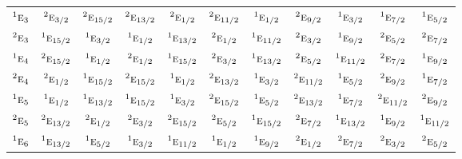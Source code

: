 \documentclass[10pt,a4paper]{article}
\numberwithin{equation}{section}
\newcommand{\irr}[1]{\text{\normalfont\scshape #1}}
\newcommand{\conjpair}[1]{{}^{#1}}
\begin{document}
{\begin{longtable}{@{}lcccccccccc@{}}
$\conjpair{1}\irr{e}_{3}$ & $\conjpair{2}\irr{e}_{3/2}$ & $\conjpair{2}\irr{e}_{15/2}$ & $\conjpair{2}\irr{e}_{13/2}$ & $\conjpair{2}\irr{e}_{1/2}$ & $\conjpair{2}\irr{e}_{11/2}$ & $\conjpair{1}\irr{e}_{1/2}$ & $\conjpair{2}\irr{e}_{9/2}$ & $\conjpair{1}\irr{e}_{3/2}$ & $\conjpair{1}\irr{e}_{7/2}$ & $\conjpair{1}\irr{e}_{5/2}$\\
$\conjpair{2}\irr{e}_{3}$ & $\conjpair{1}\irr{e}_{15/2}$ & $\conjpair{1}\irr{e}_{3/2}$ & $\conjpair{1}\irr{e}_{1/2}$ & $\conjpair{1}\irr{e}_{13/2}$ & $\conjpair{2}\irr{e}_{1/2}$ & $\conjpair{1}\irr{e}_{11/2}$ & $\conjpair{2}\irr{e}_{3/2}$ & $\conjpair{1}\irr{e}_{9/2}$ & $\conjpair{2}\irr{e}_{5/2}$ & $\conjpair{2}\irr{e}_{7/2}$\\
$\conjpair{1}\irr{e}_{4}$ & $\conjpair{2}\irr{e}_{15/2}$ & $\conjpair{1}\irr{e}_{1/2}$ & $\conjpair{2}\irr{e}_{1/2}$ & $\conjpair{1}\irr{e}_{15/2}$ & $\conjpair{2}\irr{e}_{3/2}$ & $\conjpair{1}\irr{e}_{13/2}$ & $\conjpair{2}\irr{e}_{5/2}$ & $\conjpair{1}\irr{e}_{11/2}$ & $\conjpair{2}\irr{e}_{7/2}$ & $\conjpair{1}\irr{e}_{9/2}$\\
$\conjpair{2}\irr{e}_{4}$ & $\conjpair{2}\irr{e}_{1/2}$ & $\conjpair{1}\irr{e}_{15/2}$ & $\conjpair{2}\irr{e}_{15/2}$ & $\conjpair{1}\irr{e}_{1/2}$ & $\conjpair{2}\irr{e}_{13/2}$ & $\conjpair{1}\irr{e}_{3/2}$ & $\conjpair{2}\irr{e}_{11/2}$ & $\conjpair{1}\irr{e}_{5/2}$ & $\conjpair{2}\irr{e}_{9/2}$ & $\conjpair{1}\irr{e}_{7/2}$\\
$\conjpair{1}\irr{e}_{5}$ & $\conjpair{1}\irr{e}_{1/2}$ & $\conjpair{1}\irr{e}_{13/2}$ & $\conjpair{1}\irr{e}_{15/2}$ & $\conjpair{1}\irr{e}_{3/2}$ & $\conjpair{2}\irr{e}_{15/2}$ & $\conjpair{1}\irr{e}_{5/2}$ & $\conjpair{2}\irr{e}_{13/2}$ & $\conjpair{1}\irr{e}_{7/2}$ & $\conjpair{2}\irr{e}_{11/2}$ & $\conjpair{2}\irr{e}_{9/2}$\\
$\conjpair{2}\irr{e}_{5}$ & $\conjpair{2}\irr{e}_{13/2}$ & $\conjpair{2}\irr{e}_{1/2}$ & $\conjpair{2}\irr{e}_{3/2}$ & $\conjpair{2}\irr{e}_{15/2}$ & $\conjpair{2}\irr{e}_{5/2}$ & $\conjpair{1}\irr{e}_{15/2}$ & $\conjpair{2}\irr{e}_{7/2}$ & $\conjpair{1}\irr{e}_{13/2}$ & $\conjpair{1}\irr{e}_{9/2}$ & $\conjpair{1}\irr{e}_{11/2}$\\
$\conjpair{1}\irr{e}_{6}$ & $\conjpair{1}\irr{e}_{13/2}$ & $\conjpair{1}\irr{e}_{5/2}$ & $\conjpair{1}\irr{e}_{3/2}$ & $\conjpair{1}\irr{e}_{11/2}$ & $\conjpair{1}\irr{e}_{1/2}$ & $\conjpair{1}\irr{e}_{9/2}$ & $\conjpair{2}\irr{e}_{1/2}$ & $\conjpair{2}\irr{e}_{7/2}$ & $\conjpair{2}\irr{e}_{3/2}$ & $\conjpair{2}\irr{e}_{5/2}$\\

\end{longtable}}
\end{document}
